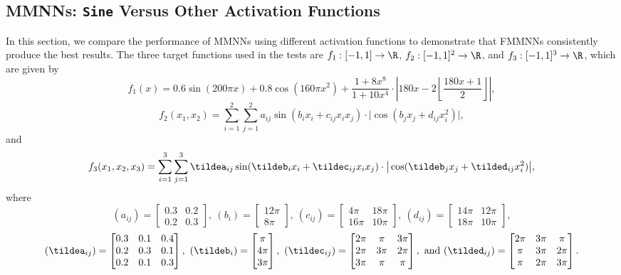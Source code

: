 \documentclass[11pt,a4paper]{article}
\begin{document}

\subsection{MMNNs: \texttt{Sine} Versus Other Activation Functions}
\label{sec:sine_vs_others}

In this section, we compare the performance of MMNNs using different activation functions to demonstrate that FMMNNs consistently produce the best results.  The three target functions used in the tests are $f_1:[-1,1]\to\R$, $f_2:[-1,1]^2\to\R$, and $f_3:[-1,1]^3\to\R$, which are given by
\[
f_1(x) =
0.6\sin(200\pi x)+0.8\cos(160\pi x^2)
+ \frac{1 + 8x^8}{1 + 10x^4} \cdot \left| 180x - 2 \left\lfloor \frac{180x + 1}{2} \right\rfloor \right|,
\]
\[f_2(x_1, x_2) = \sum_{i=1}^2 \sum_{j=1}^2 a_{ij} \sin(b_i x_i +  c_{ij} x_i x_j)\cdot  \big|\cos( b_j x_j +  d_{ij} x_i^2)\big|,\]
and
$$
f_3(x_1, x_2,x_3) = \sum_{i=1}^3 \sum_{j=1}^3 \tildea_{ij} \sin(\tildeb_i x_i + \tildec_{ij} x_i x_j) \cdot\big|\cos(\tildeb_j x_j + \tilded_{ij} x_i^2)\big|,
$$
where  
$$
(a_{ij}) = \begin{bmatrix*} 0.3 & 0.2 \\ 0.2 & 0.3 \end{bmatrix*}, 
\
(b_i) = \begin{bmatrix*} 12\pi \\  8\pi \end{bmatrix*}, 
\
(c_{ij}) = \begin{bmatrix*} 4\pi & 18\pi \\ 16\pi & 10\pi \end{bmatrix*}, 
\
(d_{ij}) = \begin{bmatrix*} 14\pi & 12\pi \\ 18\pi & 10\pi \end{bmatrix*},
$$
$$
(\tildea_{ij}) = \begin{bmatrix*} 
0.3 & 0.1 & 0.4 \\
0.2 & 0.3 & 0.1 \\
0.2 & 0.1 & 0.3
\end{bmatrix*}, 
\
(\tildeb_i) = \begin{bmatrix*} 
\pi \\ 4\pi \\ 3\pi
\end{bmatrix*}, 
\
(\tildec_{ij}) = \begin{bmatrix*} 
2\pi & \pi & 3\pi \\
2\pi & 3\pi & 2\pi \\
3\pi & \pi & \pi
\end{bmatrix*}, 
\ \tn{and} \
(\tilded_{ij}) = \begin{bmatrix*} 
2\pi & 3\pi &  \pi \\
 \pi & 3\pi & 2\pi \\
 \pi & 2\pi & 3\pi
\end{bmatrix*}.
$$
\end{document}
